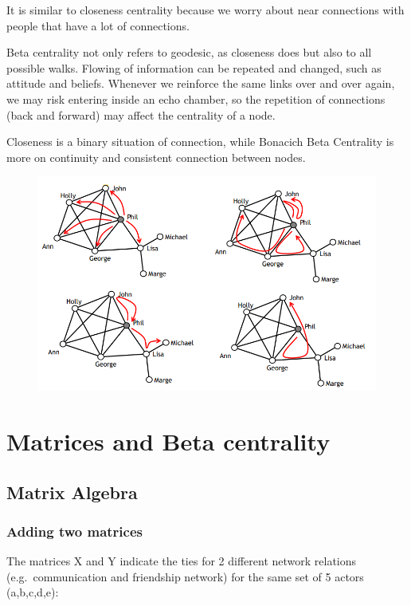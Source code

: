 \documentclass[
  notitlepage,
  onecolumn,
  openany]{book}
\begin{document}
It is similar to closeness centrality because we worry about near connections with people that have a lot of connections.

Beta centrality not only refers to geodesic, as closeness does but also to all possible walks. Flowing of information can be repeated and changed, such as attitude and beliefs. Whenever we reinforce the same links over and over again, we may risk entering inside an echo chamber, so the repetition of connections (back and forward) may affect the centrality of a node.

Closeness is a binary situation of connection, while Bonacich Beta Centrality is more on continuity and consistent connection between nodes.

\begin{figure}[h!]

{\centering \includegraphics[width=0.5\linewidth]{images/04-Centrality/Untitled 7} 

}

\end{figure}

\hypertarget{matrices-and-beta-centrality}{%
\chapter{Matrices and Beta centrality}\label{matrices-and-beta-centrality}}

\hypertarget{matrix-algebra}{%
\section{Matrix Algebra}\label{matrix-algebra}}

\hypertarget{adding-two-matrices}{%
\subsection{Adding two matrices}\label{adding-two-matrices}}

The matrices X and Y indicate the ties for 2 different network relations (e.g.~communication and friendship network) for the same set of 5 actors (a,b,c,d,e):
\end{document}

